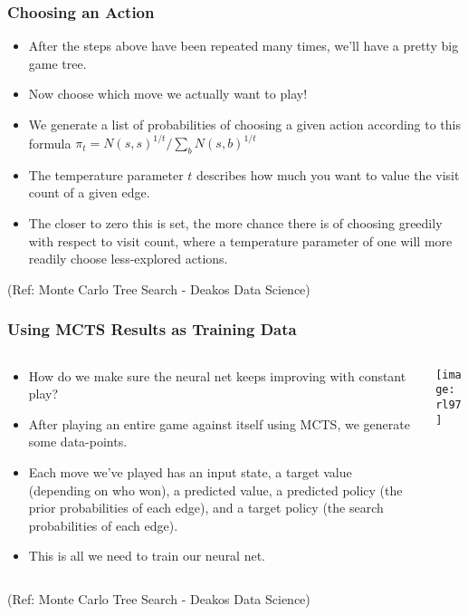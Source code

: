 \begin{frame}[fragile]\frametitle{Choosing an Action}

\begin{itemize}
\item After the steps above have been repeated many times, we'll have a pretty big game tree. 
\item Now choose which move we actually want to play! 
\item We generate a list of probabilities of choosing a given action according to this formula $\pi_t = N(s,s)^{1/t}/\sum_b N(s,b)^{1/t}$
\item The temperature parameter $t$ describes how much you want to value the visit count of a given edge. 
\item The closer to zero this is set, the more chance there is of choosing greedily with respect to visit count, where a temperature parameter of one will more readily choose less-explored actions.
\end{itemize}


{\tiny (Ref: Monte Carlo Tree Search - Deakos Data Science)}

\end{frame}


\begin{frame}[fragile]\frametitle{Using MCTS Results as Training Data}

\begin{columns}
\begin{column}{0.5\textwidth}
\begin{itemize}
\item How do we make sure the neural net keeps improving with constant play? 
\item After playing an entire game against itself using MCTS, we generate some data-points.
\item Each move we've played has an input state, a target value (depending on who won), a predicted value, a predicted policy (the prior probabilities of each edge), and a target policy (the search probabilities of each edge). 
\item This is all we need to train our neural net.
\end{itemize}
\end{column}
\begin{column}{0.5\textwidth}
\begin{center}
\texttt{[image: rl97]}
\end{center}
\end{column}
\end{columns}



{\tiny (Ref: Monte Carlo Tree Search - Deakos Data Science)}

\end{frame}

